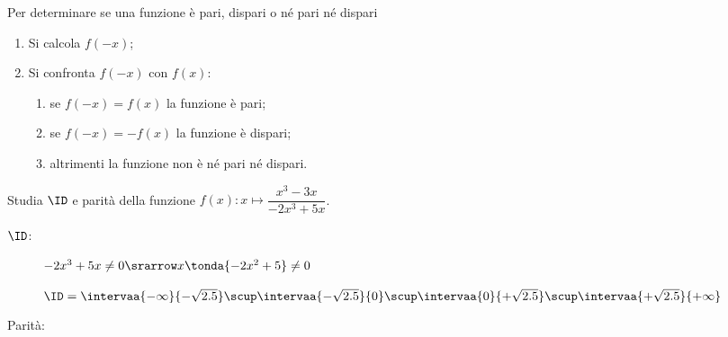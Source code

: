 \begin{procedura}
Per determinare se una funzione è pari, dispari o né pari né dispari
\begin{enumerate} [nosep]
\item Si calcola \(f(-x)\);
\item Si confronta \(f(-x)\) con \(f(x)\):
\begin{enumerate} [nosep]
\item se \(f(-x) = f(x)\) la funzione è pari;
\item se \(f(-x) = -f(x)\) la funzione è dispari;
\item altrimenti la funzione non è né pari né dispari.
\end{enumerate}
\end{enumerate}
\end{procedura}

\begin{esempio}
\label{esempio:funzioni_parita1}
Studia \(\ID\) e parità della funzione 
\(f(x): x \mapsto \dfrac{x^3 -3x}{-2x^3+5x}\).

\begin{description}
\item [\(\ID\):] \(-2x^3+5x \ne 0 \srarrow x \tonda{-2x^2+5} \ne 0\) 

\(\ID = 
\intervaa{-\infty}{-\sqrt{2.5}} \scup \intervaa{-\sqrt{2.5}}{0} \scup 
\intervaa{0}{+\sqrt{2.5}} \scup \intervaa{+\sqrt{2.5}}{+\infty}\)
\item [Parità:] ~

\end{description}
\end{esempio}

% 
% 
% 

